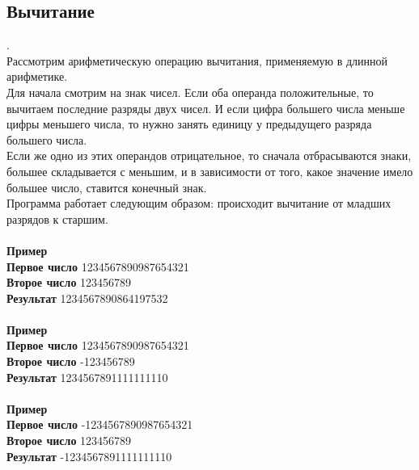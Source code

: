 \documentclass[a4paper]{article}
\begin{document}
\subsection{Вычитание}.
\\Рассмотрим арифметическую операцию вычитания, применяемую в длинной арифметике.
\\Для начала смотрим на знак чисел. Если оба операнда положительные, то вычитаем последние разряды двух чисел. И если цифра большего числа меньше цифры меньшего числа, то нужно занять единицу у предыдущего разряда большего числа.
\\Если же одно из этих операндов отрицательное, то сначала отбрасываются знаки, большее складывается с меньшим, и в зависимости от того, какое значение имело большее число, ставится конечный знак.
\\Программа работает следующим образом: происходит вычитание от младших разрядов к старшим.
\\
\\ \textbf{Пример}
\\ \textbf{Первое число} 1234567890987654321
\\ \textbf{Второе число} 123456789
\\ \textbf{Результат} 1234567890864197532
\\
\\ \textbf{Пример}
\\ \textbf{Первое число} 1234567890987654321
\\ \textbf{Второе число} -123456789
\\ \textbf{Результат} 1234567891111111110
\\
\\ \textbf{Пример}
\\ \textbf{Первое число} -1234567890987654321
\\ \textbf{Второе число} 123456789
\\ \textbf{Результат} -1234567891111111110
\end{document}
